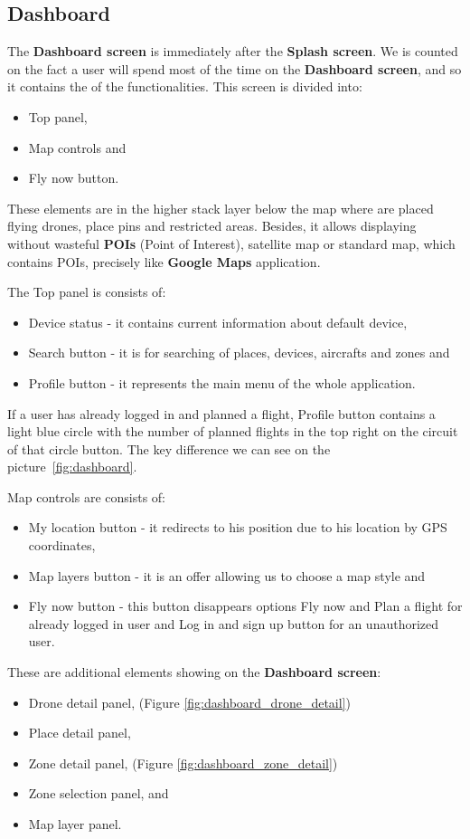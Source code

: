 \subsection{Dashboard}\label{subsec:dashboard2}

The \textbf{Dashboard screen} is immediately after the \textbf{Splash screen}.
We is counted on the fact a user will spend most of the time on the \textbf{Dashboard screen}, and so it contains the of the functionalities.
This screen is divided into:
\begin{itemize}
    \item Top panel,
    \item Map controls and
    \item Fly now button.
\end{itemize}
These elements are in the higher stack layer below the map where are placed flying drones, place pins and restricted areas.
Besides, it allows displaying without wasteful \textbf{POIs} (Point of Interest)\cite{poi}, satellite map or standard map, which contains POIs, precisely like \textbf{Google Maps} application.

The Top panel is consists of:
\begin{itemize}
    \item Device status - it contains current information about default device,
    \item Search button - it is for searching of places, devices, aircrafts and zones and
    \item Profile button - it represents the main menu of the whole application.
\end{itemize}
If a user has already logged in and planned a flight, Profile button contains a light blue circle with the number of planned flights in the top right on the circuit of that circle button.
The key difference we can see on the picture~\ref{fig:dashboard}.

Map controls are consists of:
\begin{itemize}
    \item My location button - it redirects to his position due to his location by GPS coordinates,
    \item Map layers button - it is an offer allowing us to choose a map style and
    \item Fly now button - this button disappears options Fly now and Plan a flight for already logged in user and Log in and sign up button for an unauthorized user.
\end{itemize}
These are additional elements showing on the \textbf{Dashboard screen}:
\begin{itemize}
    \item Drone detail panel, (Figure \ref{fig:dashboard_drone_detail})
    \item Place detail panel,
    \item Zone detail panel, (Figure \ref{fig:dashboard_zone_detail})
    \item Zone selection panel, and
    \item Map layer panel.
\end{itemize}

